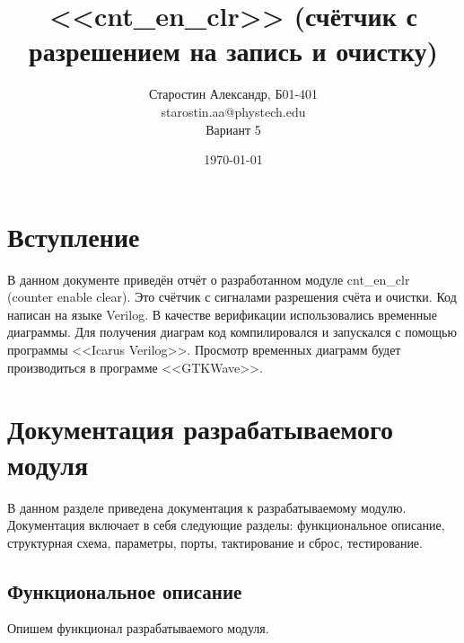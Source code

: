 \documentclass[12pt, a4paper]{article}
\title{\textbf{<<cnt\_en\_clr>> (счётчик с разрешением на запись и очистку)}}
\author{{Старостин Александр, Б01-401}\\{starostin.aa@phystech.edu} \\Вариант 5}
\date{\today}
\begin{document}
	
	\maketitle
	\thispagestyle{empty} %
	\newpage
	
	\tableofcontents
	\newpage
	
	
	
\normalsize
	
	\section{Вступление}
	
	В данном документе приведён отчёт о разработанном модуле cnt\_en\_clr (counter enable clear). Это счётчик с сигналами разрешения счёта и очистки. Код написан на языке Verilog. В качестве верификации использовались временные диаграммы. Для получения диаграм код компилировался и запускался с помощью программы <<Icarus Verilog>>. Просмотр временных диаграмм будет производиться в программе <<GTKWave>>. 

	\section{Документация разрабатываемого модуля}
	
	В данном разделе приведена документация к разрабатываемому модулю. Документация включает в себя следующие разделы: функциональное описание, структурная схема, параметры, порты, тактирование и сброс, тестирование.

	\subsection{Функциональное описание}
	
	Опишем функционал разрабатываемого модуля. \\
	
\end{document}
